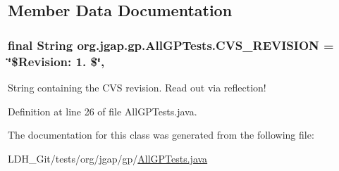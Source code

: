 \subsection{Member Data Documentation}
\hypertarget{classorg_1_1jgap_1_1gp_1_1_all_g_p_tests_a894a82d643557982f8df29d679ab8fbf}{
\subsubsection[{C\-V\-S\-\_\-\-R\-E\-V\-I\-S\-I\-O\-N}]{\setlength{\rightskip}{0pt plus 5cm}final String org.\-jgap.\-gp.\-All\-G\-P\-Tests.\-C\-V\-S\-\_\-\-R\-E\-V\-I\-S\-I\-O\-N = \char`\"{}\$Revision\-: 1. \$\char`\"{}\hspace{0.3cm}{\ttfamily [static]}, {\ttfamily [private]}}}\label{classorg_1_1jgap_1_1gp_1_1_all_g_p_tests_a894a82d643557982f8df29d679ab8fbf}
String containing the C\-V\-S revision. Read out via reflection! 

Definition at line 26 of file All\-G\-P\-Tests.\-java.



The documentation for this class was generated from the following file\-:\begin{DoxyCompactItemize}
\item 
L\-D\-H\-\_\-\-Git/tests/org/jgap/gp/\hyperlink{_all_g_p_tests_8java}{All\-G\-P\-Tests.\-java}\end{DoxyCompactItemize}
